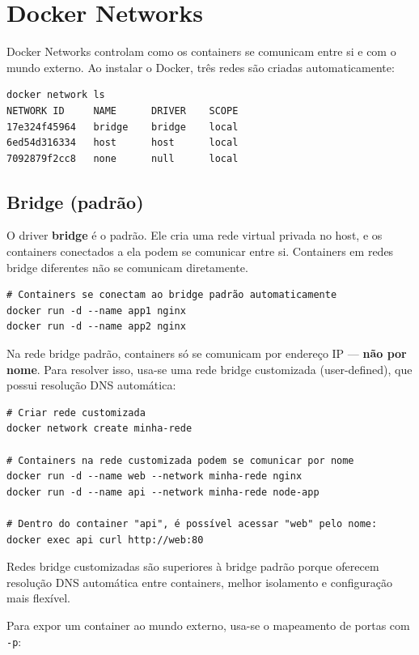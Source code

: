 \section{Docker Networks}

Docker Networks controlam como os containers se comunicam entre si e com o mundo externo. Ao instalar o Docker, três redes são criadas automaticamente:

\begin{verbatim}
docker network ls
NETWORK ID     NAME      DRIVER    SCOPE
17e324f45964   bridge    bridge    local
6ed54d316334   host      host      local
7092879f2cc8   none      null      local
\end{verbatim}

\subsection{Bridge (padrão)}

O driver \textbf{bridge} é o padrão. Ele cria uma rede virtual privada no host, e os containers conectados a ela podem se comunicar entre si. Containers em redes bridge diferentes não se comunicam diretamente.

\begin{verbatim}
# Containers se conectam ao bridge padrão automaticamente
docker run -d --name app1 nginx
docker run -d --name app2 nginx
\end{verbatim}

Na rede bridge padrão, containers só se comunicam por endereço IP --- \textbf{não por nome}. Para resolver isso, usa-se uma rede bridge customizada (user-defined), que possui resolução DNS automática:

\begin{verbatim}
# Criar rede customizada
docker network create minha-rede

# Containers na rede customizada podem se comunicar por nome
docker run -d --name web --network minha-rede nginx
docker run -d --name api --network minha-rede node-app

# Dentro do container "api", é possível acessar "web" pelo nome:
docker exec api curl http://web:80
\end{verbatim}

Redes bridge customizadas são superiores à bridge padrão porque oferecem resolução DNS automática entre containers, melhor isolamento e configuração mais flexível.

Para expor um container ao mundo externo, usa-se o mapeamento de portas com \texttt{-p}:

